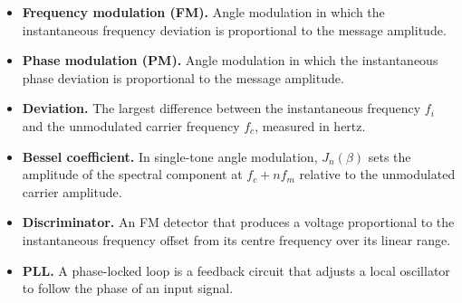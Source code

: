 \documentclass[12pt,a4paper]{article}
\begin{document}
\begin{tcolorbox}[defbox, title={One-Line Definitions}, title after break={One-Line Definitions (contd.)}]
\begin{itemize}[leftmargin=*, itemsep=3pt, topsep=0pt]
  \item \textbf{Frequency modulation (FM).} Angle modulation in which the instantaneous frequency deviation is proportional to the message amplitude.
  \item \textbf{Phase modulation (PM).} Angle modulation in which the instantaneous phase deviation is proportional to the message amplitude.
  \item \textbf{Deviation.} The largest difference between the instantaneous frequency $f_i$ and the unmodulated carrier frequency $f_c$, measured in hertz.
  \item \textbf{Bessel coefficient.} In single-tone angle modulation, $J_n(\beta)$ sets the amplitude of the spectral component at $f_c+nf_m$ relative to the unmodulated carrier amplitude.
  \item \textbf{Discriminator.} An FM detector that produces a voltage proportional to the instantaneous frequency offset from its centre frequency over its linear range.
  \item \textbf{PLL.} A phase-locked loop is a feedback circuit that adjusts a local oscillator to follow the phase of an input signal.
\end{itemize}
\end{tcolorbox}
\end{document}
